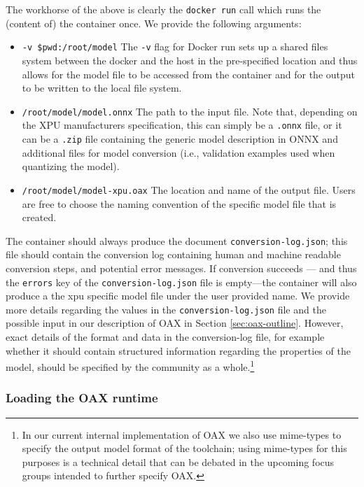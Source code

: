 \documentclass{article}
\begin{document}
The workhorse of the above is clearly the \texttt{docker run} call which runs the (content of) the container once. We provide the following arguments:
\begin{itemize}
\item \texttt{-v \$pwd:/root/model} The \texttt{-v} flag for Docker run sets up a shared files system between the docker and the host in the pre-specified location and thus allows for the model file to be accessed from the container and for the output to be written to the local file system.
\item \texttt{/root/model/model.onnx} The path to the input file. Note that, depending on the XPU manufacturers specification, this can simply be a \texttt{.onnx} file, or it can be a \texttt{.zip} file containing the generic model description in ONNX and additional files for model conversion (i.e., validation examples used when quantizing the model).
\item \texttt{/root/model/model-xpu.oax} The location and name of the output file. Users are free to choose the naming convention of the specific model file that is created.
\end{itemize}

The container should always produce the document \texttt{conversion-log.json}; this file should contain the conversion log containing human and machine readable conversion steps, and potential error messages. If conversion succeeds --- and thus the \texttt{errors} key of the \texttt{conversion-log.json} file is empty---the container will also produce a the xpu specific model file under the user provided name. We provide more details regarding the values in the \texttt{conversion-log.json} file and the possible input in our description of OAX in Section \ref{sec:oax-outline}. However, exact details of the format and data in the conversion-log file, for example whether it should contain structured information regarding the properties of the model, should be specified by the community as a whole.\footnote{In our current internal implementation of OAX we also use mime-types to specify the output model format of the toolchain; using mime-types for this purposes is a technical detail that can be debated in the upcoming focus groups intended to further specify OAX.}

\subsubsection{Loading the OAX runtime}
\end{document}
